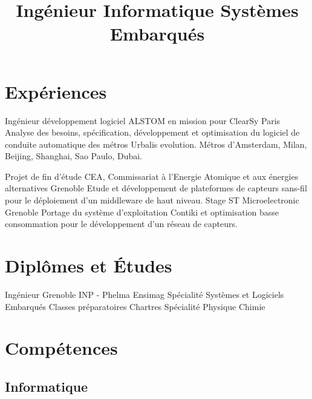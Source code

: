 \documentclass[10pt,a4paper]{moderncv}
\title{\large Ingénieur Informatique Systèmes Embarqués}
\begin{document}
\maketitle

\section{Expériences}

  {Ingénieur développement logiciel}
  {ALSTOM en mission pour ClearSy}
  {}
  {Paris}
  {Analyse des besoins, spécification, développement et optimisation du logiciel de conduite automatique des métros Urbalis evolution.\newline{} Métros d'Amsterdam, Milan, Beijing, Shanghai, Sao Paulo, Dubai.\newline{}}

  {Projet de fin d'étude}
  {CEA, Commissariat à l'Energie Atomique et aux énergies alternatives}
  {}
  {Grenoble}
  {Etude et développement de plateformes de capteurs sans-fil pour le déploiement d'un middleware de haut niveau.\newline{}}
  {Stage}
  {ST Microelectronic}
  {}
  {Grenoble}
  {Portage du système d'exploitation Contiki et optimisation basse consommation pour le développement d'un réseau de capteurs.\newline{}}

\section{Diplômes et Études}
  {Ingénieur Grenoble INP - Phelma Ensimag}
  {}
  {}
  {}
  {Spécialité Systèmes et Logiciels Embarqués\newline{}}
  {Classes préparatoires}
  {}
  {}
  {Chartres}
  {Spécialité Physique Chimie\newline{}}

\section{Compétences}

  \subsection{Informatique}
\end{document}
